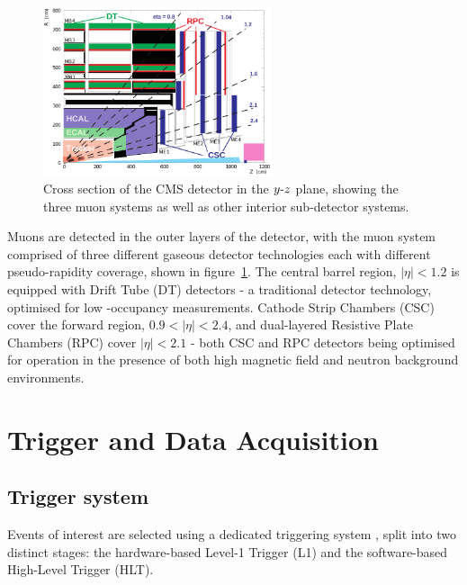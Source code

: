\begin{figure}[ht!]
\centering
\includegraphics[width=0.6\textwidth]{Figs/machine/pictures_MuonSys-mod3.png}
\caption{Cross section of the CMS detector in the $y{\hbox{-}} z$ plane,
showing the three
muon systems as well as other interior sub-detector systems.}
\label{fig:muon_system_diagram}
\end{figure}

Muons are detected in the outer layers of the detector, with the muon system 
comprised of three different gaseous detector technologies each with different 
pseudo-rapidity coverage, shown in figure~\ref{fig:muon_system_diagram}. The
central barrel region, $|\eta|<1.2$ is equipped with 
Drift Tube (DT) detectors - a traditional detector technology, optimised for low
-occupancy measurements. Cathode Strip Chambers (CSC) cover the forward region,
$0.9 < |\eta| < 2.4$, and dual-layered Resistive Plate Chambers (RPC) cover
$|\eta| < 2.1$ - both CSC and RPC detectors being optimised for operation in 
the presence of both high magnetic field and neutron background environments.

\section{Trigger and Data Acquisition}  %
\label{sec:detector_trigger}

\subsection{Trigger system}
Events of interest are selected using a dedicated triggering system \cite{tridasTDR},
split into two distinct stages: the hardware-based Level-1 Trigger (L1) and
the software-based High-Level Trigger (HLT).

